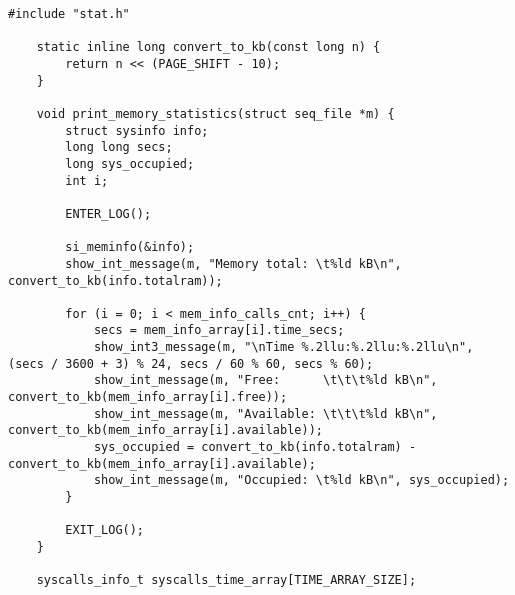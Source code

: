 \begin{lstlisting}[caption={листинг файла stat.c}]
	#include "stat.h"
	
	static inline long convert_to_kb(const long n) {
		return n << (PAGE_SHIFT - 10);
	}
	
	void print_memory_statistics(struct seq_file *m) {
		struct sysinfo info;
		long long secs;
		long sys_occupied;
		int i;
		
		ENTER_LOG();
		
		si_meminfo(&info);
		show_int_message(m, "Memory total: \t%ld kB\n", convert_to_kb(info.totalram));
		
		for (i = 0; i < mem_info_calls_cnt; i++) {
			secs = mem_info_array[i].time_secs;
			show_int3_message(m, "\nTime %.2llu:%.2llu:%.2llu\n", (secs / 3600 + 3) % 24, secs / 60 % 60, secs % 60);
			show_int_message(m, "Free:      \t\t\t%ld kB\n", convert_to_kb(mem_info_array[i].free));
			show_int_message(m, "Available: \t\t\t%ld kB\n", convert_to_kb(mem_info_array[i].available));
			sys_occupied = convert_to_kb(info.totalram) - convert_to_kb(mem_info_array[i].available);
			show_int_message(m, "Occupied: \t%ld kB\n", sys_occupied);
		}
		
		EXIT_LOG();
	}
	
	syscalls_info_t syscalls_time_array[TIME_ARRAY_SIZE];
	

\end{lstlisting}
